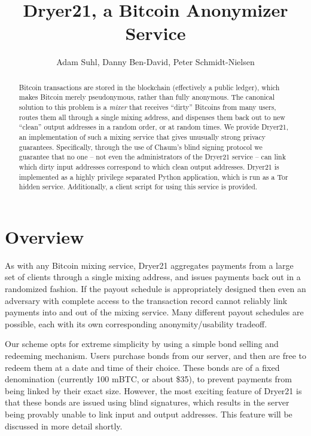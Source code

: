 \documentclass[12pt]{article}
\title{Dryer21, a Bitcoin Anonymizer Service}
\author{Adam Suhl, Danny Ben-David, Peter Schmidt-Nielsen}
\begin{document}
\maketitle
\begin{abstract}
Bitcoin transactions are stored in the blockchain (effectively a public ledger), which makes Bitcoin merely pseudonymous, rather than fully anonymous.
The canonical solution to this problem is a \emph{mixer} that receives ``dirty'' Bitcoins from many users, routes them all through a single mixing address, and dispenses them back out to new ``clean'' output addresses in a random order, or at random times.
We provide Dryer21, an implementation of such a mixing service that gives unusually strong privacy guarantees.
Specifically, through the use of Chaum's blind signing protocol we guarantee that no one -- not even the administrators of the Dryer21 service -- can link which dirty input addresses correspond to which clean output addresses.
Dryer21 is implemented as a highly privilege separated Python application, which is run as a Tor hidden service.
Additionally, a client script for using this service is provided.
\end{abstract}

\section{Overview}
As with any Bitcoin mixing service, Dryer21 aggregates payments from a large set of clients through a single mixing address, and issues payments back out in a randomized fashion.
If the payout schedule is appropriately designed then even an adversary with complete access to the transaction record cannot reliably link payments into and out of the mixing service.
Many different payout schedules are possible, each with its own corresponding anonymity/usability tradeoff.

Our scheme opts for extreme simplicity by using a simple bond selling and redeeming mechanism.
Users purchase bonds from our server, and then are free to redeem them at a date and time of their choice.
These bonds are of a fixed denomination (currently 100 mBTC, or about \$35), to prevent payments from being linked by their exact size.
However, the most exciting feature of Dryer21 is that these bonds are issued using blind signatures, which results in the server being provably unable to link input and output addresses.
This feature will be discussed in more detail shortly.
\end{document}
